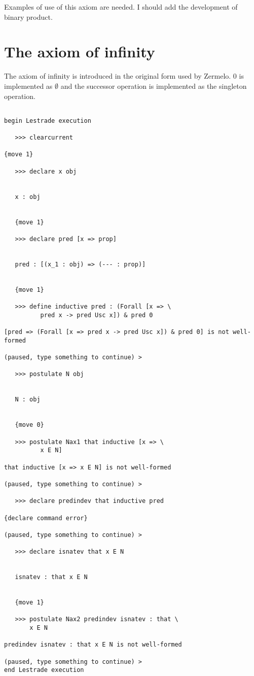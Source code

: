 \documentclass[12pt]{article}
\begin{document}
Examples of use of this axiom are needed.  I should add the development of binary product.


\section{The axiom of infinity}

The axiom of infinity is introduced in the original form used by Zermelo.  0 is implemented as $\emptyset$ and the successor operation is implemented as the singleton operation.

\begin{verbatim}

begin Lestrade execution

   >>> clearcurrent

{move 1}

   >>> declare x obj


   x : obj


   {move 1}

   >>> declare pred [x => prop]


   pred : [(x_1 : obj) => (--- : prop)]


   {move 1}

   >>> define inductive pred : (Forall [x => \
          pred x -> pred Usc x]) & pred 0

[pred => (Forall [x => pred x -> pred Usc x]) & pred 0] is not well-formed

(paused, type something to continue) >

   >>> postulate N obj


   N : obj


   {move 0}

   >>> postulate Nax1 that inductive [x => \
          x E N]

that inductive [x => x E N] is not well-formed

(paused, type something to continue) >

   >>> declare predindev that inductive pred

{declare command error}

(paused, type something to continue) >

   >>> declare isnatev that x E N


   isnatev : that x E N


   {move 1}

   >>> postulate Nax2 predindev isnatev : that \
       x E N

predindev isnatev : that x E N is not well-formed

(paused, type something to continue) >
end Lestrade execution
\end{verbatim}
\end{document}
